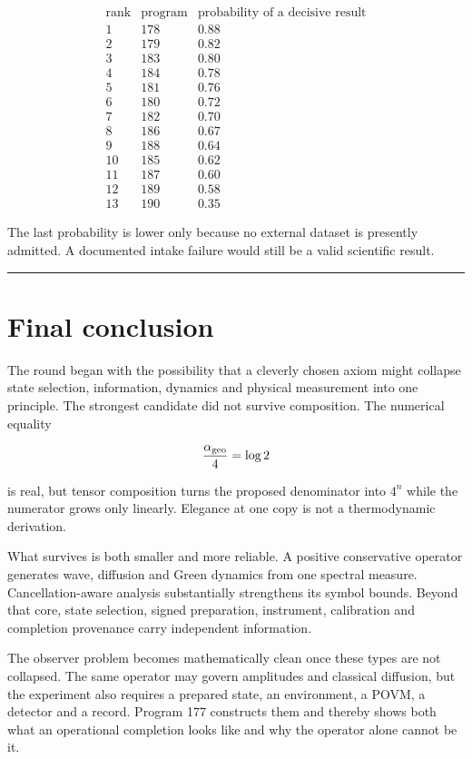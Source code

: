 \documentclass[11pt,a4paper,openany]{report}
\begin{document}
\[
\begin{array}{c|c|c}
\text{rank}&\text{program}&\text{probability of a decisive result}\\
\hline
1&178&0.88\\
2&179&0.82\\
3&183&0.80\\
4&184&0.78\\
5&181&0.76\\
6&180&0.72\\
7&182&0.70\\
8&186&0.67\\
9&188&0.64\\
10&185&0.62\\
11&187&0.60\\
12&189&0.58\\
13&190&0.35
\end{array}
\]

The last probability is lower only because no external dataset is presently admitted. A documented intake failure would still be a valid scientific result.

\par\medskip\hrule\medskip

\chapter{Final conclusion}

The round began with the possibility that a cleverly chosen axiom might collapse state selection, information, dynamics and physical measurement into one principle. The strongest candidate did not survive composition. The numerical equality

\[
\frac{\alpha_{\rm geo}}4=\log2
\]

is real, but tensor composition turns the proposed denominator into \(4^n\) while the numerator grows only linearly. Elegance at one copy is not a thermodynamic derivation.

What survives is both smaller and more reliable. A positive conservative operator generates wave, diffusion and Green dynamics from one spectral measure. Cancellation-aware analysis substantially strengthens its symbol bounds. Beyond that core, state selection, signed preparation, instrument, calibration and completion provenance carry independent information.

The observer problem becomes mathematically clean once these types are not collapsed. The same operator may govern amplitudes and classical diffusion, but the experiment also requires a prepared state, an environment, a POVM, a detector and a record. Program 177 constructs them and thereby shows both what an operational completion looks like and why the operator alone cannot be it.
\end{document}

